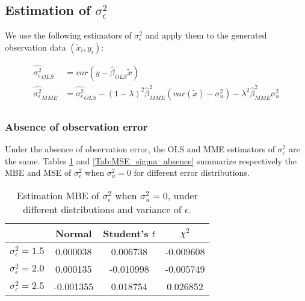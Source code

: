 \documentclass{article}
\begin{document}
\subsection{Estimation of $\sigma^2_\epsilon$}

We use the following estimators of $\sigma^2_\epsilon$ and apply them to the generated observation data $(\tilde{x}_i, y_i)$:

\begin{equation}
    \begin{split}
        \hat{\sigma^2_\epsilon}_{OLS} &= var\left(y - \hat{\beta}_{OLS} \tilde{x}\right)\\
        \hat{\sigma^2_\epsilon}_{MME} &= \hat{\sigma^2_\epsilon}_{OLS} -  (1-\lambda)^2 \hat{\beta}_{MME}^2 (var(\tilde{x}) - \sigma^2_u) - \lambda^2 \hat{\beta}_{MME}^2 \sigma^2_u\\
    \end{split}
\end{equation}

\subsubsection{Absence of observation error}

Under the absence of observation error, the OLS and MME estimators of $\sigma^2_\epsilon$ are the same. 
Tables \ref{Tab:MBE_sigma_absence} and \ref{Tab:MSE_sigma_absence} summarize respectively the MBE and MSE of $\sigma^2_\epsilon$ when $\sigma^2_u=0$ for different error distributions.

\begin{table}[ht]
    \centering
    \caption{Estimation MBE of $\sigma^2_\epsilon$ when $\sigma^2_u=0$, under different distributions and variance of $\epsilon$.}
    \label{Tab:MBE_sigma_absence}
    \begin{tabular}[t]{lccc}
        \hline
        &Normal&Student's $t$&$\chi^2$\\
        \hline
        $\sigma^2_\epsilon = 1.5$&0.000038&0.006738&-0.009608\\
        $\sigma^2_\epsilon = 2.0$&0.000135&-0.010998&-0.005749\\
        $\sigma^2_\epsilon = 2.5$&-0.001355&0.018754& 0.026852\\
        \hline
    \end{tabular}
\end{table}
\end{document}
